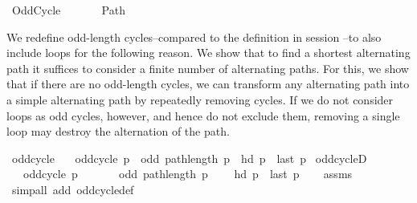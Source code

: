 %
\begin{isabellebody}%
%
%
\isadelimtheory
%
\endisadelimtheory
%
\isatagtheory
{}\isamarkupfalse%
\ Odd{\isacharunderscore}{\kern0pt}Cycle\isanewline
\ \ \isanewline
\ \ \ \ Path\isanewline
{}%
\endisatagtheory
{\isafoldtheory}%
%
\isadelimtheory
%
\endisadelimtheory
%
\begin{isamarkuptext}%
We redefine odd-length cycles--compared to the definition in session --to also include
loops for the following reason. We show that to find a shortest alternating path it suffices to
consider a finite number of alternating paths. For this, we show that if there are no odd-length
cycles, we can transform any alternating path into a simple alternating path by repeatedly removing
cycles. If we do not consider loops as odd cycles, however, and hence do not exclude them, removing
a single loop may destroy the alternation of the path.%
\end{isamarkuptext}\isamarkuptrue%
\isamarkupfalse%
\ odd{\isacharunderscore}{\kern0pt}cycle\ \isanewline
\ \ {\isachardoublequoteopen}odd{\isacharunderscore}{\kern0pt}cycle\ p\ {\isasymequiv}\ odd\ {\isacharparenleft}{\kern0pt}path{\isacharunderscore}{\kern0pt}length\ p{\isacharparenright}{\kern0pt}\ {\isasymand}\ hd\ p\ {\isacharequal}{\kern0pt}\ last\ p{\isachardoublequoteclose}\isanewline
%
\isadeliminvisible
\isanewline
%
\endisadeliminvisible
%
\isataginvisible
{}\isamarkupfalse%
\ odd{\isacharunderscore}{\kern0pt}cycleD{\isacharcolon}{\kern0pt}\isanewline
\ \ \ {\isachardoublequoteopen}odd{\isacharunderscore}{\kern0pt}cycle\ p{\isachardoublequoteclose}\isanewline
\ \ \isanewline
\ \ \ \ {\isachardoublequoteopen}odd\ {\isacharparenleft}{\kern0pt}path{\isacharunderscore}{\kern0pt}length\ p{\isacharparenright}{\kern0pt}{\isachardoublequoteclose}\isanewline
\ \ \ \ {\isachardoublequoteopen}hd\ p\ {\isacharequal}{\kern0pt}\ last\ p{\isachardoublequoteclose}%
\endisataginvisible
{\isafoldinvisible}%
%
\isadeliminvisible
\isanewline
%
\endisadeliminvisible
%
\isadelimproof
\ \ %
\endisadelimproof
%
\isatagproof
{}\isamarkupfalse%
\ assms\isanewline
\ \ \isamarkupfalse%
\ {\isacharparenleft}{\kern0pt}simp{\isacharunderscore}{\kern0pt}all\ add{\isacharcolon}{\kern0pt}\ odd{\isacharunderscore}{\kern0pt}cycle{\isacharunderscore}{\kern0pt}def{\isacharparenright}{\kern0pt}%

\end{isabellebody}
